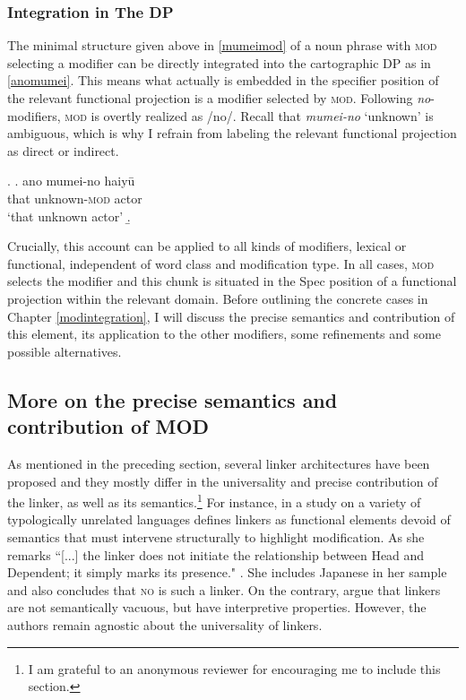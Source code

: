 \documentclass [output=book,colorlinks,citecolor=brown]{langscibook}
\begin{document}
\subsubsection{Integration in The DP}

The minimal structure given above in \ref{mumeimod} of a noun phrase with \textsc{mod} selecting a modifier can be directly integrated into the cartographic DP as in \ref{anomumei}. This means what actually is embedded in the specifier position of the relevant functional projection is a modifier selected by \textsc{mod}. Following \textit{no}-modifiers, \textsc{mod} is overtly realized as /no/. Recall that \textit{mumei-no} `unknown’ is ambiguous, which is why I refrain from labeling the relevant functional projection as direct or indirect. %


\ex. \label{anomumei} \ag. ano mumei-no haiyū\\
that unknown-\textsc{mod} actor\\
`that unknown actor’
\b. 

Crucially, this account can be applied to all kinds of modifiers, lexical or functional, independent of word class and modification type. In all cases, \textsc{mod} selects the modifier and this chunk is situated in the Spec position of a functional projection within the relevant domain. Before outlining the concrete cases in Chapter \ref{modintegration}, I will discuss the precise semantics and contribution of this element, its application to the other modifiers, some refinements and some possible alternatives.

\subsection{More on the precise semantics and contribution of MOD} \label{semantics mod}

As mentioned in the preceding section, several linker architectures have been proposed and they mostly differ in the universality and precise contribution of the linker, as well as its semantics.\footnote{I am grateful to an anonymous reviewer for encouraging me to include this section.} For instance, \citet{philip:2012:linkers} in a study on a variety of typologically unrelated languages defines linkers as functional elements devoid of semantics that must intervene structurally to highlight modification. As she remarks ``[...] the linker does not initiate the relationship between Head and Dependent; it simply marks its presence." \citep[65]{philip:2012:linkers}. She includes Japanese in her sample and also concludes that \textsc{no} is such a linker. On the contrary, \citet{franco:2015:linkers} argue that linkers are not semantically vacuous, but have interpretive properties. However, the authors remain agnostic about the universality of linkers.
\end{document}
